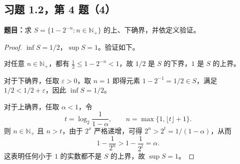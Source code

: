 \documentclass[UTF8, fontset=fandol, a4paper, 12pt]{ctexart}
\newcommand{\Nplus}{\mathbb{N}_{+}}
\theoremstyle{definition}
\begin{document}
\subsection{习题 1.2，第 4 题（4）}
\noindent\textbf{题目：}求 $S=\{1-2^{-n}:n\in\Nplus\}$ 的上、下确界，并依定义验证。

\begin{proof}
$\inf S=1/2$，$\sup S=1$。验证如下。

对任意 $n\in\Nplus$，都有 $\frac12\le1-2^{-n}<1$，故 $1/2$ 是 $S$ 的下界，$1$ 是 $S$ 的上界。

对于下确界，任取 $\varepsilon>0$，取 $n=1$ 即得元素 $1-2^{-1}=1/2\in S$，满足 $1/2<1/2+\varepsilon$，因此 $\inf S=1/2$。

对于上确界，任取 $\alpha<1$，令
\[
 t=\log_2\frac1{1-\alpha},\qquad
 n=\max\{1,\lfloor t\rfloor+1\}.
\]
则 $n\in\Nplus$ 且 $n>t$，由于 $2^x$ 严格递增，可得 $2^n>2^t=1/(1-\alpha)$，从而
\[
 1-\frac1{2^n}>1-\frac1{2^t}=\alpha.
\]
这表明任何小于 $1$ 的实数都不是 $S$ 的上界，故 $\sup S=1$。
\end{proof}
\end{document}
